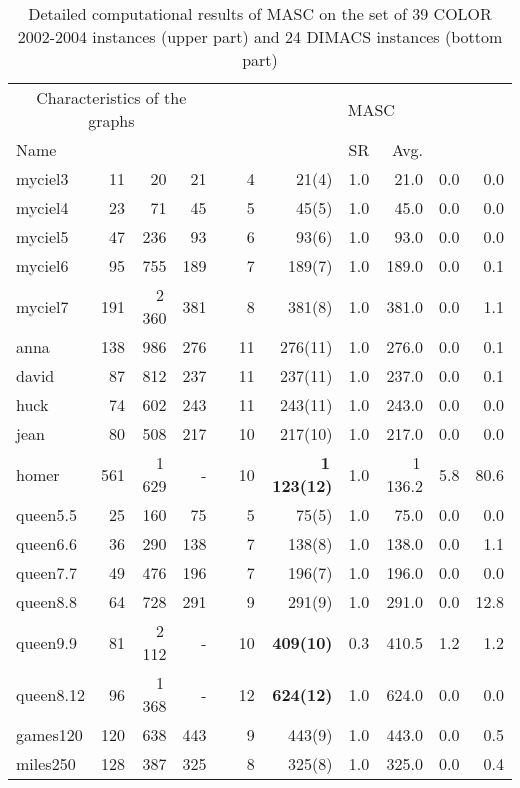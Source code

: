 \documentclass{elsart}
\begin{document}
\renewcommand{\baselinestretch}{0.7}\large\normalsize
\begin{table}\begin{scriptsize}
\caption{Detailed computational results of MASC on the set of 39 COLOR 2002-2004 instances (upper part) and 24 DIMACS instances (bottom part)}
\label{table_MASC}
\begin{tabular}{lrrrcrrrrrr}
\hline
\multicolumn{4}{c}{Characteristics of the graphs} && \multicolumn{6}{c}{MASC}\\
\cline{1-4}\cline{6-11}
Name &  &  &  &&  &  &SR& Avg. &  &  \\
\hline
myciel3    & 11 & 20   & 21 &&4& 21(4)  &1.0& 21.0&0.0 & 0.0  \\
myciel4    & 23 & 71  & 45  &&5& 45(5)  &1.0& 45.0&0.0 & 0.0   \\
myciel5    & 47 & 236 &  93 &&6&  93(6)  &1.0& 93.0&0.0 & 0.0 \\
myciel6    & 95 & 755  &   189 &&7&   189(7)  &1.0& 189.0&0.0 & 0.1  \\
myciel7    & 191 & 2\,360  & 381  &&8& 381(8)  &1.0& 381.0&0.0 & 1.1\\
anna    & 138 & 986  & 276 &&11& 276(11)  &1.0& 276.0&0.0 &0.1  \\
david    & 87 & 812  & 237 &&11& 237(11)  &1.0& 237.0&0.0 & 0.1\\
huck    & 74 & 602   & 243 &&11& 243(11)  &1.0& 243.0&0.0 & 0.0\\
jean    & 80 & 508  & 217 &&10& 217(10)  &1.0& 217.0&0.0 &0.0 \\
homer    & 561 & 1\,629  & -  &&10 & \textbf{1\,123(12)}  &1.0 & 1\,136.2&5.8  &80.6 \\
queen5.5    & 25 & 160  & 75    &&5& 75(5)  &1.0& 75.0&0.0 & 0.0  \\
queen6.6    & 36 & 290  & 138 &&7& 138(8) &1.0& 138.0&0.0 & 1.1  \\
queen7.7    & 49 & 476 &  196 &&7&  196(7) &1.0& 196.0&0.0 & 0.0 \\
queen8.8    & 64 & 728 & 291 &&9& 291(9) &1.0& 291.0&0.0 & 12.8   \\
queen9.9    & 81 & 2\,112 & -  &&10& \textbf{409(10)} &0.3 & 410.5&1.2  & 1.2   \\
queen8.12    & 96 & 1\,368 & -  &&12& \textbf{624(12)} &1.0& 624.0&0.0 & 0.0   \\
games120    & 120 & 638 & 443  &&9& 443(9) &1.0& 443.0&0.0 & 0.5\\
miles250    & 128 & 387  & 325  &&8& 325(8) &1.0& 325.0&0.0 & 0.4 \\

\end{tabular}
\end{scriptsize}
\end{table}
\end{document}
